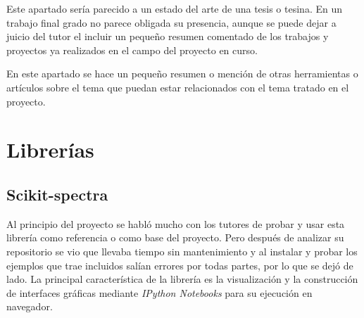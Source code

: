 
Este apartado sería parecido a un estado del arte de una tesis o tesina. En un
trabajo final grado no parece obligada su presencia, aunque se puede dejar a
juicio del tutor el incluir un pequeño resumen comentado de los trabajos y
proyectos ya realizados en el campo del proyecto en curso.

En este apartado se hace un pequeño resumen o mención de otras herramientas o
artículos sobre el tema que puedan estar relacionados con el tema tratado en el
proyecto.

\section{Librerías}
\subsection{Scikit-spectra}
Al principio del proyecto se habló mucho con los tutores de probar y usar esta
librería como referencia o como base del proyecto. Pero después de analizar su
repositorio se vio que llevaba tiempo sin mantenimiento y al instalar y probar
los ejemplos que trae incluidos salían errores por todas partes, por lo que se
dejó de lado. La principal característica de la librería es la visualización y
la construcción de interfaces gráficas mediante \textit{IPython Notebooks} para
su ejecución en navegador\cite{art:skspec}.

